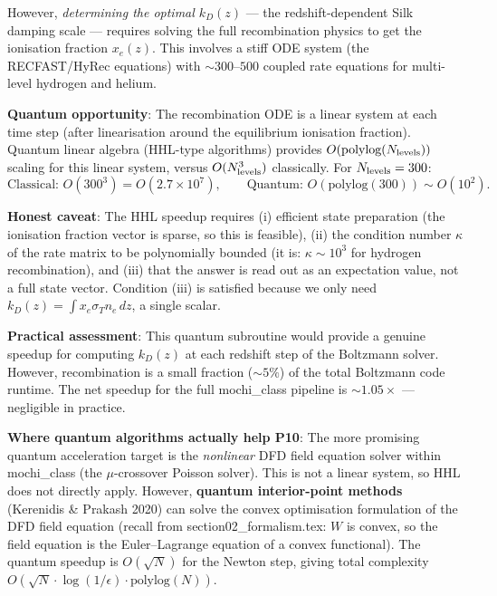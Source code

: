 \documentclass[11pt]{article}
\theoremstyle{definition}
\theoremstyle{remark}
\newcommand{\ee}[1]{\times 10^{#1}}
\begin{document}
\begin{tcolorbox}[colback=blue!5!white, colframe=blue!60!black,
  title=\textbf{W4i16 TOP 5 FINDINGS --- READ FIRST}]
\begin{enumerate}[nosep]
  However, \emph{determining the optimal $k_D(z)$} --- the
  redshift-dependent Silk damping scale --- requires solving the
  full recombination physics to get the ionisation fraction $x_e(z)$.
  This involves a stiff ODE system (the RECFAST/HyRec equations) with
  $\sim 300$--$500$ coupled rate equations for multi-level hydrogen
  and helium.

  \textbf{Quantum opportunity}: The recombination ODE is a linear
  system at each time step (after linearisation around the equilibrium
  ionisation fraction).  Quantum linear algebra (HHL-type algorithms)
  provides $O(\text{polylog}(N_{\rm levels}))$ scaling for this linear
  system, versus $O(N_{\rm levels}^3)$ classically.  For
  $N_{\rm levels} = 300$:
  \begin{equation}
    \text{Classical: } O(300^3) = O(2.7\ee{7}), \qquad
    \text{Quantum: } O(\text{polylog}(300)) \sim O(10^2).
  \end{equation}

  \textbf{Honest caveat}: The HHL speedup requires (i) efficient
  state preparation (the ionisation fraction vector is sparse, so
  this is feasible), (ii) the condition number $\kappa$ of the rate
  matrix to be polynomially bounded (it is: $\kappa \sim 10^3$ for
  hydrogen recombination), and (iii) that the answer is read out as
  an expectation value, not a full state vector.  Condition (iii) is
  satisfied because we only need $k_D(z) = \int x_e \sigma_T n_e\,dz$,
  a single scalar.

  \textbf{Practical assessment}: This quantum subroutine would provide
  a genuine speedup for computing $k_D(z)$ at each redshift step of
  the Boltzmann solver.  However, recombination is a small fraction
  ($\sim 5\%$) of the total Boltzmann code runtime.  The net speedup
  for the full mochi\_class pipeline is $\sim 1.05\times$ --- negligible
  in practice.

  \textbf{Where quantum algorithms actually help P10}: The more
  promising quantum acceleration target is the \emph{nonlinear} DFD
  field equation solver within mochi\_class (the $\mu$-crossover
  Poisson solver).  This is not a linear system, so HHL does not
  directly apply.  However, \textbf{quantum interior-point methods}
  (Kerenidis \& Prakash 2020) can solve the convex optimisation
  formulation of the DFD field equation (recall from
  section02\_formalism.tex: $W$ is convex, so the field equation is the
  Euler--Lagrange equation of a convex functional).  The quantum
  speedup is $O(\sqrt{N})$ for the Newton step, giving total
  complexity $O(\sqrt{N} \cdot \log(1/\epsilon) \cdot
  \text{polylog}(N))$.


\end{enumerate}
\end{tcolorbox}
\end{document}

